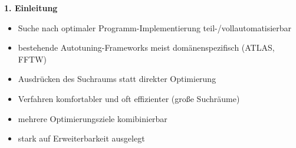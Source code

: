     \begin{frame}
    \textbf{1. Einleitung}
        
    \begin{itemize}
      \item Suche nach optimaler Programm-Implementierung teil-/vollautomatisierbar
            
      \item bestehende Autotuning-Frameworks meist domänenspezifisch (ATLAS, FFTW) \newline

    \end{itemize}
    \begin{itemize}
      \item Ausdrücken des Suchraums statt direkter Optimierung
      \item Verfahren komfortabler und oft effizienter (große Suchräume)
      
      \item mehrere Optimierungsziele komibinierbar
            
      \item stark auf Erweiterbarkeit ausgelegt
      
    \end{itemize}
      
% 
    \end{frame}
    
    
